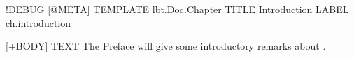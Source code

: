 \begin{lbt}
  !DEBUG
  [@META]
    TEMPLATE lbt.Doc.Chapter
    TITLE Introduction
    LABEL ch.introduction

  [+BODY]
    TEXT The Preface will give some introductory remarks about \lbtlogo.
  
\end{lbt}

